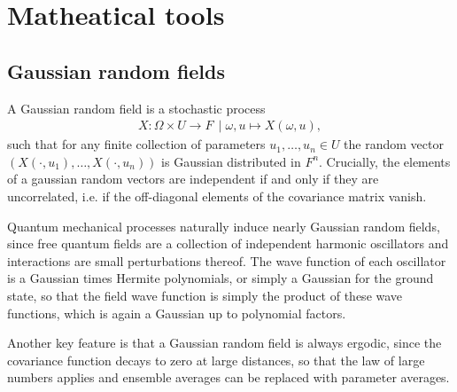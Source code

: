 \chapter{Matheatical tools}\label{ch:math_tools}



\section{Gaussian random fields}

A Gaussian random field is a stochastic process
\begin{align}
    X:\Omega\times U \to F\,\mid \omega,u\mapsto X(\omega,u),
\end{align}
such that for any finite collection of parameters $u_1,\dots,u_n\in U$ the random vector $(X(\cdot,u_1),\dots,X(\cdot,u_n))$ is Gaussian distributed in $F^n$.
Crucially, the elements of a gaussian random vectors are independent if and only if they are uncorrelated, i.e. if the off-diagonal elements of the covariance matrix vanish.

Quantum mechanical processes naturally induce nearly Gaussian random fields, since free quantum fields are a collection of independent harmonic oscillators and interactions are small perturbations thereof.
The wave function of each oscillator is a Gaussian times Hermite polynomials, or simply a Gaussian for the ground state, so that the field wave function is simply the product of these wave functions, which is again a Gaussian up to polynomial factors.

Another key feature is that a Gaussian random field is always ergodic, since the covariance function decays to zero at large distances, so that the law of large numbers applies and ensemble averages can be replaced with parameter averages.

